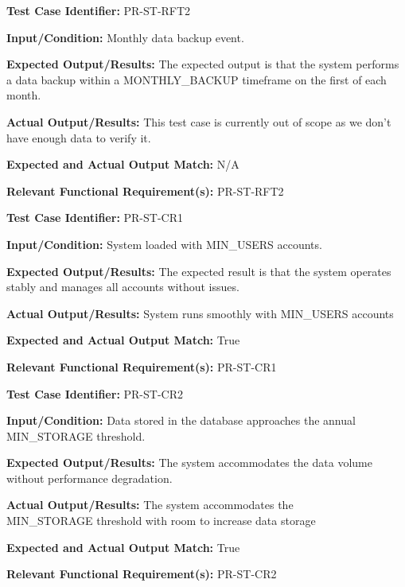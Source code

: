 \documentclass[12pt, titlepage]{article}
\begin{document}
\begin{mdframed}[linewidth=0.5mm]
  \textbf{Test Case Identifier:} PR-ST-RFT2 \par
  \textbf{Input/Condition:} Monthly data backup event. \par
  \textbf{Expected Output/Results:} The expected output is that the system performs a data backup within a MONTHLY\_BACKUP timeframe on the first of each month. \par
  \textbf{Actual Output/Results:} This test case is currently out of scope as we don't have enough data to verify it.\par
  \textbf{Expected and Actual Output Match:} N/A \par
  \textbf{Relevant Functional Requirement(s):} PR-ST-RFT2
\end{mdframed}

\begin{mdframed}[linewidth=0.5mm]
  \textbf{Test Case Identifier:} PR-ST-CR1 \par
  \textbf{Input/Condition:} System loaded with MIN\_USERS accounts. \par
  \textbf{Expected Output/Results:} The expected result is that the system operates stably and manages all accounts without issues. \par
  \textbf{Actual Output/Results:} System runs smoothly with MIN\_USERS accounts\par
  \textbf{Expected and Actual Output Match:} True \par
  \textbf{Relevant Functional Requirement(s):} PR-ST-CR1
\end{mdframed}

\begin{mdframed}[linewidth=0.5mm]
  \textbf{Test Case Identifier:} PR-ST-CR2 \par
  \textbf{Input/Condition:} Data stored in the database approaches the annual \\MIN\_STORAGE threshold. \par
  \textbf{Expected Output/Results:} The system accommodates the data volume without performance degradation. \par
  \textbf{Actual Output/Results:} The system accommodates the \\MIN\_STORAGE threshold with room to increase data storage\par
  \textbf{Expected and Actual Output Match:} True \par
  \textbf{Relevant Functional Requirement(s):} PR-ST-CR2
\end{mdframed}
\end{document}
